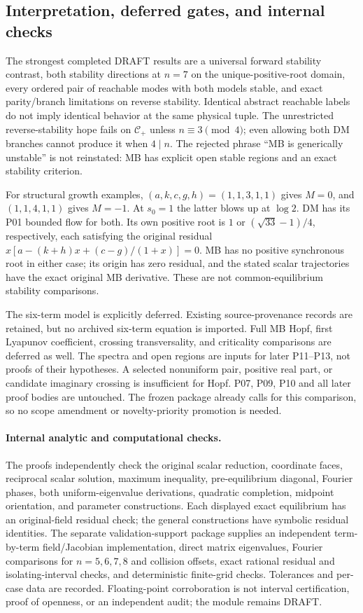 \subsection{Interpretation, deferred gates, and internal checks}
\label{slot:P08-6}
The strongest completed DRAFT results are a universal forward stability
contrast, both stability directions at $n=7$ on the unique-positive-root
domain, every ordered pair of reachable modes with both models stable,
and exact parity/branch limitations on reverse stability. Identical
abstract reachable labels do not imply identical behavior at the same
physical tuple. The unrestricted reverse-stability hope fails on
$\mathcal C_+$ unless $n\equiv3\pmod4$; even allowing both DM
branches cannot produce it when $4\mid n$.
The rejected phrase ``MB is generically unstable'' is not reinstated:
MB has explicit open stable regions and an exact stability criterion.

For structural growth examples, $(a,k,c,g,h)=(1,1,3,1,1)$ gives
$M=0$, and $(1,1,4,1,1)$ gives $M=-1$. At $s_0=1$ the latter blows
up at $\log2$. DM has its P01 bounded flow for both. Its own positive
root is $1$ or $(\sqrt{33}-1)/4$, respectively, each satisfying the
original residual $x[a-(k+h)x+(c-g)/(1+x)]=0$.
MB has no positive synchronous root in either case; its origin has zero
residual, and the stated scalar trajectories have the exact original
MB derivative. These are not common-equilibrium stability comparisons.

\label{slot:P08-extra-1}
The six-term model is explicitly deferred. Existing source-provenance
records are retained, but no archived six-term equation is imported.
Full MB Hopf, first Lyapunov coefficient, crossing transversality, and
criticality comparisons are deferred as well. The spectra and open
regions are inputs for later P11--P13, not proofs of their hypotheses.
A selected nonuniform pair, positive real part, or candidate imaginary
crossing is insufficient for Hopf. P07, P09, P10 and all later proof
bodies are untouched. The frozen package already calls for this
comparison, so no scope amendment or novelty-priority promotion is needed.

\paragraph{Internal analytic and computational checks.}
The proofs independently check the original scalar reduction, coordinate
faces, reciprocal scalar solution, maximum inequality, pre-equilibrium
diagonal, Fourier phases, both uniform-eigenvalue derivations, quadratic
completion, midpoint orientation, and parameter constructions.
Each displayed exact equilibrium has an original-field residual check;
the general constructions have symbolic residual identities.
The separate validation-support package supplies an independent
term-by-term field/Jacobian implementation, direct matrix eigenvalues,
Fourier comparisons for $n=5,6,7,8$ and collision offsets, exact rational
residual and isolating-interval checks, and deterministic finite-grid
checks. Tolerances and per-case data are recorded. Floating-point
corroboration is not interval certification, proof of openness, or an
independent audit; the module remains DRAFT.

